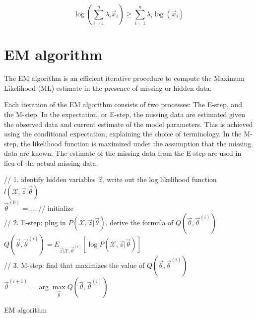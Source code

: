 \begin{proposition}
\begin{equation}
\log\left(\sum\limits_{i=1}^n \lambda_i\vec{x}_i\right) \geq \sum\limits_{i=1}^n {\lambda_i \log(\vec{x}_i)}
\end{equation}
\end{proposition}


\section{EM algorithm}
The EM algorithm is an efficient iterative procedure to compute the Maximum Likelihood (ML) estimate in the presence of missing or hidden data. 

Each iteration of the EM algorithm consists of two processes: The E-step, and the M-step. In the expectation, or E-step, the missing data are estimated given the observed data and current estimate of the model parameters. This is achieved using the conditional expectation, explaining the choice of terminology. In the M-step, the likelihood function is maximized under the assumption that the missing data are known. The estimate of the missing data from the E-step are used in lieu of the actual missing data.

\begin{algorithm}[htbp]
    \SetAlgoNoLine

	// 1. identify hidden variables $\vec{z}$, write out the log likelihood function $l(\mathcal{X},\vec{z}|\vec{\theta})$ \\
	$\vec{\theta}^{(0)}$ = ... // initialize \\
	
	 {
	    // 2. E-step: plug in $P(\mathcal{X},\vec{z}|\vec{\theta})$, derive the formula of $Q(\vec{\theta}, \vec{\theta}^{(i)})$ \\
	    $Q(\vec{\theta}, \vec{\theta}^{(i)})=E_{\vec{z}|\mathcal{X},\vec{\theta}^{(i)}}\left[\log P(\mathcal{X},\vec{z}|\vec{\theta})\right]$ \\
	    // 3. M-step: find \vec{\theta} that maximizes the value of $Q(\vec{\theta}, \vec{\theta}^{(i)})$ \\
		$\vec{\theta}^{(i+1)}=\arg\max\limits_{\vec{\theta}} Q(\vec{\theta}, \vec{\theta}^{(i)})$ \\
	}
	
\caption{EM algorithm}
\end{algorithm}

